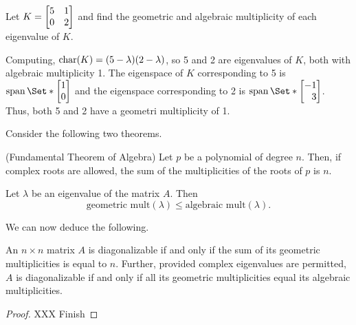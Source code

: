 \begin{example}
	Let $K=\mat{5&1\\0&2}$ and find the geometric and algebraic multiplicity of each eigenvalue of $K$.
	
	Computing, $\operatorname{char}(K)=(5-\lambda)(2-\lambda)$, so 5 and 2 are eigenvalues of $K$, both with algebraic multiplicity 1.
	The eigenspace of $K$ corresponding to 5 is $\Span\Set*{\mat{1\\0}}$ and the eigenspace
	corresponding to 2 is $\Span\Set*{\mat{-1\\3}}$. Thus, both 5 and 2 have a geometri 
	multiplicity of 1.
\end{example}


Consider the following two theorems.

\begin{theorem}(Fundamental Theorem of Algebra)
	Let $p$ be a polynomial of degree $n$. Then, if complex roots are allowed,
	the sum of the multiplicities of the roots of $p$ is $n$.
\end{theorem}

\begin{theorem}
	Let $\lambda$ be an eigenvalue of the matrix $A$. Then
	\[
		\text{geometric mult}(\lambda)\leq \text{algebraic mult}(\lambda).
	\]
\end{theorem}

We can now deduce the following.
\begin{theorem}
	An $n\times n$ matrix $A$ is diagonalizable if and only if the sum of its geometric multiplicities
	is equal to $n$. Further, provided complex eigenvalues are permitted, $A$ is diagonalizable if and
	only if all its geometric multiplicities equal its algebraic multiplicities.
\end{theorem}
\begin{proof}
	XXX Finish
\end{proof}
